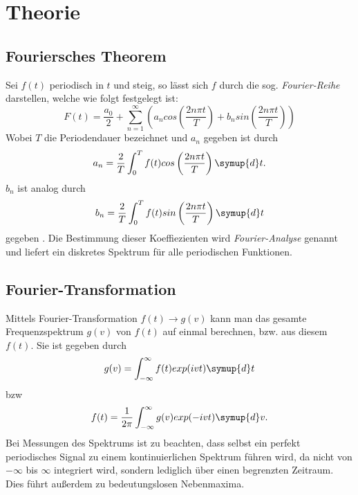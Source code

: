 \section{Theorie}
\label{sec:Theorie}

\subsection{Fouriersches Theorem}
\label{sec:Theorem}
Sei $f(t)$ periodisch in $t$ und steig, so lässt sich $f$ durch die sog. \textit{Fourier-Reihe} darstellen, welche wie folgt festgelegt ist:
\begin{equation}
  F(t)= \frac{a_0}{2} + \sum_{n = 1}^\infty \left( a_n cos \left( \frac{2 n \pi t}{T} \right) + b_n sin \left( \frac{2 n \pi t}{T} \right) \right)
  \label{eqn:Fourier-Reihe}
\end{equation}
Wobei $T$ die Periodendauer bezeichnet und $a_n$ gegeben ist durch
\begin{equation}
  a_n = \frac{2}{T} \int_0^T f(t) cos\left(\frac{2 n \pi t}{T}\right) \symup{d}t .
  \label{eqn:an}
\end{equation}
$b_n$ ist analog durch
\begin{equation}
  b_n = \frac{2}{T} \int_0^T f(t) sin\left(\frac{2 n \pi t}{T}\right) \symup{d}t
  \label{eqn:bn}
\end{equation}
gegeben \cite{sample}.
Die Bestimmung dieser Koeffiezienten wird \textit{Fourier-Analyse} genannt und liefert ein diskretes Spektrum für alle periodischen Funktionen.

\subsection{Fourier-Transformation}
\label{sec:Trafo}
Mittels Fourier-Transformation $f(t) \to g(v)$ kann man das gesamte Frequenzspektrum $g(v)$ von $f(t)$ auf einmal berechnen, bzw. aus diesem $f(t)$. Sie ist gegeben durch
\begin{equation}
  g(v) = \int_{-\infty}^{\infty} f(t)exp(ivt) \symup{d}t
  \label{eq:trafo}
\end{equation}
bzw
\begin{equation}
  f(t) = \frac{1}{2\pi} \int_{-\infty}^{\infty} g(v)exp(-ivt) \symup{d}v.
  \label{eq:backtrafo}
\end{equation}
Bei Messungen des Spektrums ist zu beachten, dass selbst ein perfekt periodisches Signal zu einem kontinuierlichen Spektrum führen wird, da nicht von $-\infty$ bis $\infty$ integriert wird, sondern lediglich über einen begrenzten Zeitraum. Dies führt außerdem zu bedeutungslosen Nebenmaxima.
